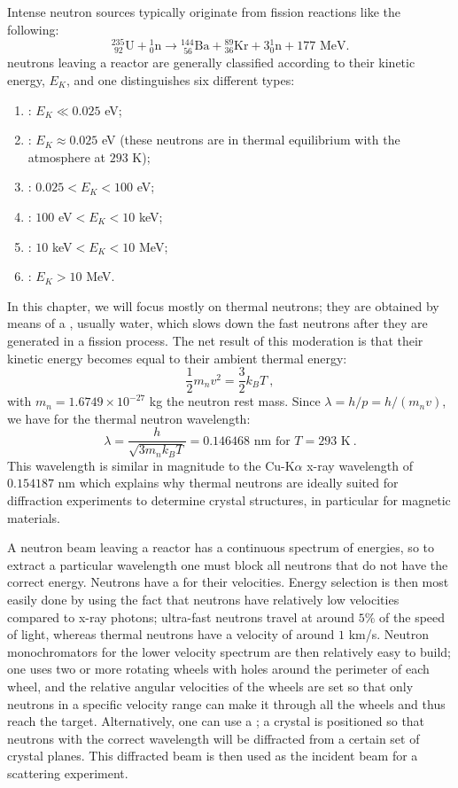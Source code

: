 Intense neutron sources typically originate from fission reactions like the following:
\[
	{}^{235}_{\,\,92}\mathrm{U}+{}^{1}_{0}\mathrm{n}\rightarrow {}^{144}_{\,\,56}\mathrm{Ba}+{}^{89}_{36}\mathrm{Kr}+3{}^{1}_{0}\mathrm{n}+177\text{ MeV} .
\]
neutrons leaving a reactor are generally classified according to their kinetic energy, $E_K$, and one distinguishes six different types:
\begin{enumerate}
	\item {}: $E_K\ll 0.025$ eV;
	\item {}: $E_K\approx 0.025$ eV (these neutrons are in thermal equilibrium with the atmosphere at $293$ K);
	\item {}: $0.025 < E_K < 100$ eV;
	\item {}: $100$ eV$<E_K<10$ keV;
	\item {}: $10$ keV$<E_K<10$ MeV;
	\item {}: $E_K>10$ MeV.	
\end{enumerate}
In this chapter, we will focus mostly on thermal neutrons; they are obtained by means of a , usually water, which slows down the fast neutrons after they are generated in a fission process. The net result of this moderation is that their kinetic energy becomes equal to their ambient thermal energy:
\[
	\frac{1}{2}m_nv^2 = \frac{3}{2}k_B T\ ,
\]
with $m_n=1.6749\times 10^{-27}$ kg the neutron rest mass. Since $\lambda = h/p = h/(m_nv)$, we have for the thermal neutron wavelength:
\begin{equation}
	\lambda = \frac{h}{\sqrt{3m_nk_BT}} = 0.146468\text{ nm for $T=293$ K}\ .\label{\chabbr:eq:nwavelength}
\end{equation}
This wavelength is similar in magnitude to the Cu-K$\alpha$ x-ray wavelength of $0.154187$ nm which explains why thermal neutrons are ideally suited for diffraction experiments to determine crystal structures, in particular for magnetic materials.

A neutron beam leaving a reactor has a continuous spectrum of energies, so to extract a particular wavelength one must block all neutrons that do not have the correct energy.  Neutrons have a  for their velocities.  Energy selection is then most easily done by using the fact that neutrons have relatively low velocities compared to x-ray photons; ultra-fast neutrons travel at around $5\%$ of the speed of light, whereas thermal neutrons have a velocity of around $1$ km/s.  Neutron monochromators for the lower velocity spectrum are then relatively easy to build; one uses two or more rotating wheels with holes around the perimeter of each wheel, and the relative angular velocities of the wheels are set so that only neutrons in a specific velocity range can make it through all the wheels and thus reach the target.  Alternatively, one can use a ; a crystal is positioned so that neutrons with the correct wavelength will be diffracted from a certain set of crystal planes.  This diffracted beam is then used as the incident beam for a scattering experiment. 


